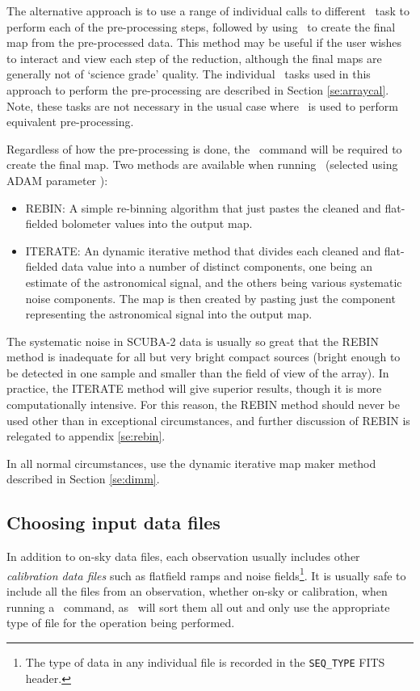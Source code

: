 \documentclass[oneside,11pt]{starlink}
\begin{document}
The alternative approach is to use a range of individual calls to
different \SMURF\ task to perform each of the pre-processing steps,
followed by using \makemap\ to create the final map from the
pre-processed data. This method may be useful if the user wishes to
interact and view each step of the reduction, although the final maps are
generally not of `science grade' quality. The individual \SMURF\ tasks
used in this approach to perform the pre-processing are described in
Section \ref{se:arraycal}. Note, these tasks are not necessary in the usual
case where \makemap\ is used to perform equivalent pre-processing.

Regardless of how the pre-processing is done, the \makemap\ command will
be required to create the final map.  Two methods are available when
running \makemap\ (selected using ADAM parameter ):

\begin{itemize}
\item REBIN: A simple re-binning algorithm that just pastes the cleaned and
flat-fielded bolometer values into the output map.
\item ITERATE: An dynamic iterative method that divides each cleaned and
flat-fielded data value into a number of distinct components, one being an
estimate of the astronomical signal, and the others being various
systematic noise components. The map is then created by pasting just the
component representing the astronomical signal into the output map.
\end{itemize}

The systematic noise in SCUBA-2 data is usually so great that the REBIN
method is inadequate for all but very bright compact sources (bright
enough to be detected in one sample and smaller than the field of view of
the array). In practice, the ITERATE method will give superior results,
though it is more computationally intensive. For this reason, the REBIN
method should never be used other than in exceptional circumstances, and
further discussion of REBIN is relegated to appendix \ref{se:rebin}.

In all normal circumstances, use the dynamic iterative map maker method
described in Section \ref{se:dimm}.

\subsection{Choosing input data files}
In addition to on-sky data files, each observation usually includes
other \emph{calibration data files} such as flatfield ramps and noise
fields\footnote{The type of data in any individual file is recorded in
the \texttt{SEQ\_TYPE} FITS header.}. It is usually safe to include all
the files from an observation, whether on-sky or calibration, when
running a \SMURF\ command, as \SMURF\ will sort them all out and only use
the appropriate type of file for the operation being performed.
\end{document}
